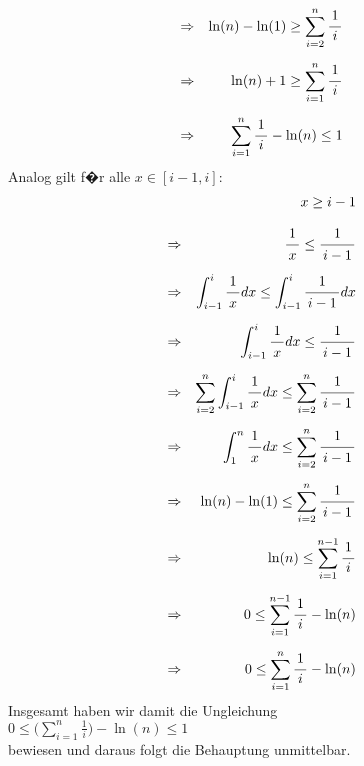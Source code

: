 \documentclass{article}
\newcommand{\bruch}[2]{\frac{\displaystyle \raisebox{1pt}[0pt][-0pt]{$\,#1\,$}}{\displaystyle \raisebox{0pt}[9pt]{$\,#2\,$}}}
\begin{document}
\begin{enumerate}
\begin{eqnarray*}
      & \Rightarrow & \ln(n) - \ln(1) \geq \sum\limits_{i=2}^{n} \bruch{1}{i} \\[0.2cm]
      & \Rightarrow & \ln(n) + 1 \geq \sum\limits_{i=1}^{n} \bruch{1}{i} \\[0.2cm]
      & \Rightarrow & \sum\limits_{i=1}^{n} \bruch{1}{i} - \ln(n) \leq 1 
      \end{eqnarray*}
      Analog gilt f�r alle $x \in [i-1,i]$:
      \begin{eqnarray*}
      &             & x \geq i - 1 \\[0.3cm]
      & \Rightarrow & \bruch{1}{x} \leq \bruch{1}{i-1} \\[0.2cm]
      & \Rightarrow & \int_{i-1}^i \bruch{1}{x} dx \leq \int_{i-1}^i \bruch{1}{i-1} dx \\[0.2cm]
      & \Rightarrow & \int_{i-1}^i \bruch{1}{x} dx \leq \bruch{1}{i-1} \\[0.2cm]
      & \Rightarrow & \sum\limits_{i=2}^{n} \int_{i-1}^i \bruch{1}{x} dx \leq 
                      \sum\limits_{i=2}^{n} \bruch{1}{i-1}                      \\[0.2cm]
      & \Rightarrow & \int_{1}^n \bruch{1}{x} dx \leq \sum\limits_{i=2}^{n} \bruch{1}{i-1} \\[0.2cm]
      & \Rightarrow & \ln(n) - \ln(1) \leq \sum\limits_{i=2}^{n} \bruch{1}{i-1} \\[0.2cm]
      & \Rightarrow & \ln(n) \leq \sum\limits_{i=1}^{n-1} \bruch{1}{i} \\[0.2cm]
      & \Rightarrow & 0 \leq \sum\limits_{i=1}^{n-1} \bruch{1}{i} - \ln(n) \\[0.2cm]
      & \Rightarrow & 0 \leq \sum\limits_{i=1}^{n} \bruch{1}{i} - \ln(n) 
      \end{eqnarray*}
      Insgesamt haben wir damit die Ungleichung
      \\[0.2cm]
      \hspace*{1.3cm}
      $0 \leq \biggl(\sum\limits_{i=1}^n \frac{1}{i}\biggr) - \ln(n) \leq 1$
      \\[0.2cm]
      bewiesen und daraus folgt die Behauptung unmittelbar.
\end{enumerate}

\vspace{0.3cm}
\end{document}
